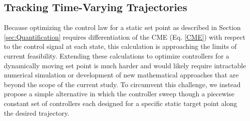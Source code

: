 \documentclass[12pt]{iopart}
\begin{document}
\subsection{Tracking Time-Varying Trajectories}\label{sec:Dynamic}
Because optimizing the control law for a static set point as described in Section \ref{sec:Quantification} requires differentiation of the CME (Eq. \ref{CME}) with respect to the control signal at each state, this calculation is approaching the limits of current feasibility.
Extending these calculations to optimize controllers for a dynamically moving set point is much harder and would likely require intractable numerical simulation or development of new mathematical approaches that are beyond the scope of the current study. 
To circumvent this challenge, we instead propose a simple alternative in which the controller sweep though a piecewise constant set of controllers each designed for a specific static target point along the desired trajectory.
\end{document}
